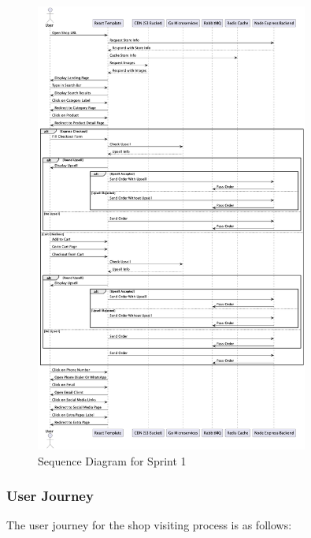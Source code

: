 \begin{figure}[H]
    \centering
    \includegraphics[width=0.8\textwidth]{images/sprintOneSequence.png}
    \caption{Sequence Diagram for Sprint 1}
    \label{fig:sequence_diagram_sprint1}
\end{figure}

\subsubsection{User Journey}

The user journey for the shop visiting process is as follows:


